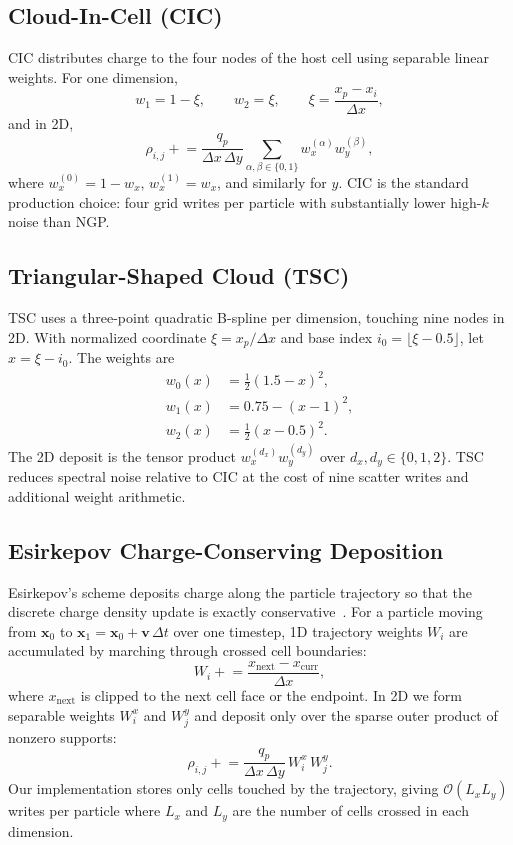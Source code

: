 \subsection{Cloud-In-Cell (CIC)}
CIC distributes charge to the four nodes of the host cell using separable linear weights.
For one dimension,
\begin{equation}
    w_1 = 1-\xi, \qquad w_2 = \xi, \qquad \xi = \frac{x_p-x_i}{\Delta x},
\end{equation}
and in 2D,
\begin{equation}
    \rho_{i,j} \mathrel{+}= \frac{q_p}{\Delta x\,\Delta y}
    \sum_{\alpha,\beta \in \{0,1\}} w_x^{(\alpha)} w_y^{(\beta)},
\end{equation}
where $w_x^{(0)}=1-w_x$, $w_x^{(1)}=w_x$, and similarly for $y$.
CIC is the standard production choice: four grid writes per particle with substantially lower high-$k$ noise than NGP.

\subsection{Triangular-Shaped Cloud (TSC)}
TSC uses a three-point quadratic B-spline per dimension, touching nine nodes in 2D.
With normalized coordinate $\xi = x_p/\Delta x$ and base index $i_0 = \lfloor \xi - 0.5 \rfloor$,
let $x = \xi - i_0$. The weights are
\begin{align}
    w_0(x) &= \tfrac{1}{2}(1.5-x)^2, \\
    w_1(x) &= 0.75 - (x-1)^2, \\
    w_2(x) &= \tfrac{1}{2}(x-0.5)^2.
\end{align}
The 2D deposit is the tensor product $w_x^{(d_x)} w_y^{(d_y)}$ over $d_x,d_y \in \{0,1,2\}$.
TSC reduces spectral noise relative to CIC at the cost of nine scatter writes and additional weight arithmetic.

\subsection{Esirkepov Charge-Conserving Deposition}
Esirkepov's scheme deposits charge along the particle trajectory so that the discrete charge density update is exactly conservative~\cite{esirkepov2001}.
For a particle moving from $\mathbf{x}_0$ to $\mathbf{x}_1 = \mathbf{x}_0 + \mathbf{v}\,\Delta t$ over one timestep,
1D trajectory weights $W_i$ are accumulated by marching through crossed cell boundaries:
\begin{equation}
    W_i \mathrel{+}= \frac{x_{\mathrm{next}} - x_{\mathrm{curr}}}{\Delta x},
\end{equation}
where $x_{\mathrm{next}}$ is clipped to the next cell face or the endpoint.
In 2D we form separable weights $W^x_i$ and $W^y_j$ and deposit only over the sparse outer product of nonzero supports:
\begin{equation}
    \rho_{i,j} \mathrel{+}= \frac{q_p}{\Delta x\,\Delta y}\, W^x_i\, W^y_j.
\end{equation}
Our implementation stores only cells touched by the trajectory, giving $\mathcal{O}(L_x L_y)$ writes per particle where $L_x$ and $L_y$ are the number of cells crossed in each dimension.
